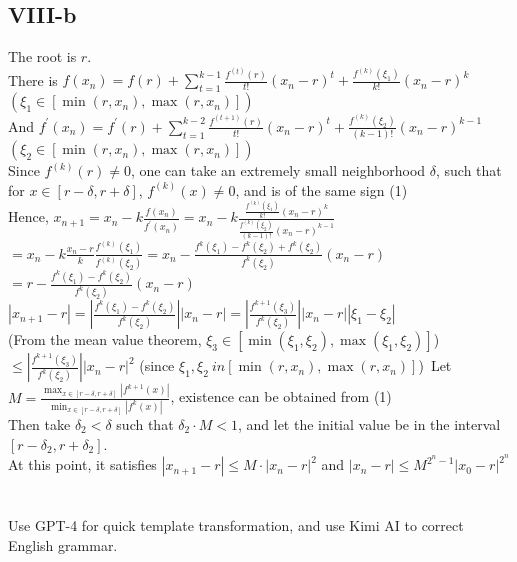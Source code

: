 \documentclass[a4paper]{article}
\begin{document}
\subsection*{VIII-b}
The root is \( r \).\\
There is \(f(x_n) = f(r) + \sum_{t=1}^{k-1} \frac{f^{(t)}(r)}{t!} (x_n - r)^t + \frac{f^{(k)}(\xi_1)}{k!} (x_n - r)^k\)\\
\( (\xi_1 \in [\min(r, x_n), \max(r, x_n)]) \)\\
And \(f^{'}(x_n) = f^{'}(r) + \sum_{t=1}^{k-2} \frac{f^{(t+1)}(r)}{t!} (x_n - r)^t + \frac{f^{(k)}(\xi_2)}{(k-1)!} (x_n - r)^{k-1}\)\
\( (\xi_2 \in [\min(r, x_n), \max(r, x_n)]) \)\\
Since \(f^{(k)}(r) \neq 0\), one can take an extremely small neighborhood \( \delta \), such that for \( x \in [r - \delta, r + \delta] \), \(f^{(k)}(x) \neq 0 \), and is of the same sign \hfill(1)\\
Hence, \( x_{n+1} = x_n - k \frac{f(x_n)}{f^{'}(x_n)} = x_n - k \frac{\frac{f^{(k)}(\xi_1)}{k!} (x_n - r)^k}{\frac{f^{(k)}(\xi_2)}{(k-1)!} (x_n - r)^{k-1}} \)\\
\( = x_n - k \frac{x_n - r}{k} \frac{f^{(k)}(\xi_1)}{f^{(k)}(\xi_2)} = x_n - \frac{f^{k}(\xi_1) - f^{k}(\xi_2) + f^{k}(\xi_2)}{f^{k}(\xi_2)} (x_n - r) \)\\
\( = r - \frac{f^{k}(\xi_1) - f^{k}(\xi_2)}{f^{k}(\xi_2)} (x_n - r) \)\\
\( |x_{n+1} - r| = \left|\frac{f^{k}(\xi_1) - f^{k}(\xi_2)}{f^{k}(\xi_2)}\right| |x_n - r| = \left|\frac{f^{k+1}(\xi_3)}{f^{k}(\xi_2)}\right| |x_n - r| |\xi_1 - \xi_2| \)\\
(From the mean value theorem, \( \xi_3 \in [\min(\xi_1, \xi_2), \max(\xi_1, \xi_2)] \))\
\( \leq \left|\frac{f^{k+1}(\xi_3)}{f^{k}(\xi_2)}\right| |x_n - r|^2 \) (since \( \xi_1, \xi_2 \ in [\min(r, x_n), \max(r, x_n)] \))\
Let \( M = \frac{\max_{x \in [r - \delta, r + \delta]} |f^{k+1}(x)|}{\min_{x \in [r - \delta, r + \delta]} |f^{k}(x)|} \), existence can be obtained from (1)\\
Then take \( \delta_2 < \delta \) such that \( \delta_2 \cdot M < 1 \), and let the initial value be in the interval \( [r - \delta_2, r + \delta_2] \).\\
At this point, it satisfies \( |x_{n+1} - r| \leq M \cdot |x_n - r|^2 \) and \( |x_n - r| \leq M^{2^n - 1} |x_0 - r|^{2^n} \)

\section*{ \center{\normalsize {Acknowledgement}} }
Use GPT-4 for quick template transformation, and use Kimi AI to correct English grammar.
\end{document}
